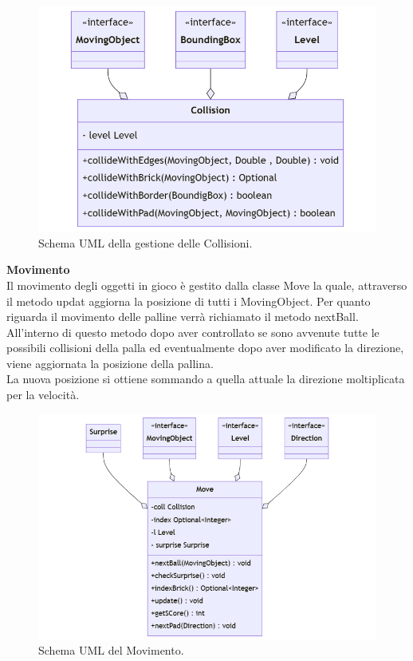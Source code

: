 \documentclass[a4paper,12pt]{report}
\begin{document}
\begin{figure}[H]
    \centering{}
    \includegraphics[scale=0.6]{images/Collision.png}
    \caption{Schema UML della gestione delle Collisioni.}
    \label{images:Collision}
\end{figure}
\pagebreak
\textbf{Movimento}\\
Il movimento degli oggetti in gioco è gestito dalla classe Move la quale,
attraverso il metodo updat aggiorna la posizione di tutti i MovingObject.
Per quanto riguarda il movimento delle palline verrà richiamato il metodo nextBall.
\\All'interno di questo metodo dopo aver controllato se sono avvenute tutte le possibili collisioni della palla ed eventualmente dopo aver modificato la direzione, viene aggiornata la posizione della pallina.
\\La nuova posizione si ottiene sommando a quella attuale la direzione moltiplicata per la velocità.
\begin{figure}[H]
    \centering{}
    \includegraphics[scale=0.6]{images/Move.png}
    \caption{Schema UML del Movimento.}
    \label{images:Move}
\end{figure}
\end{document}
